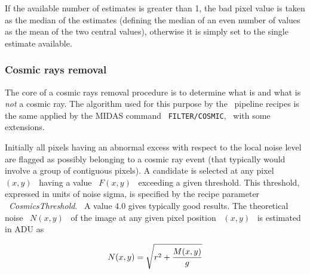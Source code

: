 If the available number of estimates is greater than 1, the
bad pixel value is taken as the median of the estimates (defining
the median of an even number of values as the mean of the two
central values), otherwise it is simply set to the single estimate 
available.

\subsubsection{Cosmic rays removal}
\label{sec:ACOSMIC}

The core of a cosmic rays removal procedure is to determine what is
and what is {\it not} a cosmic ray. The algorithm used for this
purpose by the \pipename\, pipeline recipes is the same applied by the MIDAS 
command \ {\tt FILTER/COSMIC}, \ with some extensions.

Initially all pixels having an abnormal excess with respect
to the local noise level are flagged as possibly belonging to a
cosmic ray event (that typically would involve a group of contiguous 
pixels).  A candidate is selected at any pixel \ $(x,y)$ \ having a value 
\ $F(x,y)$ \ exceeding a given threshold. This threshold, expressed in
units of noise sigma, is specified by the recipe parameter 
\ {\it CosmicsThreshold}. \ A value 4.0 gives typically good results.
The theoretical
noise \ $N(x,y)$ \ of the image at any given pixel position \ $(x,y)$ \ is 
estimated in ADU as 

$$
          N(x,y) = \sqrt{r^2 + {M(x,y) \over g}}
$$


